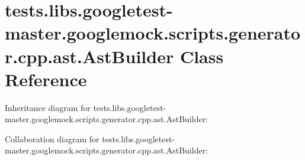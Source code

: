 \hypertarget{classtests_1_1libs_1_1googletest-master_1_1googlemock_1_1scripts_1_1generator_1_1cpp_1_1ast_1_1AstBuilder}{}\section{tests.\+libs.\+googletest-\/master.googlemock.\+scripts.\+generator.\+cpp.\+ast.\+Ast\+Builder Class Reference}
\label{classtests_1_1libs_1_1googletest-master_1_1googlemock_1_1scripts_1_1generator_1_1cpp_1_1ast_1_1AstBuilder}


Inheritance diagram for tests.\+libs.\+googletest-\/master.googlemock.\+scripts.\+generator.\+cpp.\+ast.\+Ast\+Builder\+:


Collaboration diagram for tests.\+libs.\+googletest-\/master.googlemock.\+scripts.\+generator.\+cpp.\+ast.\+Ast\+Builder\+:
